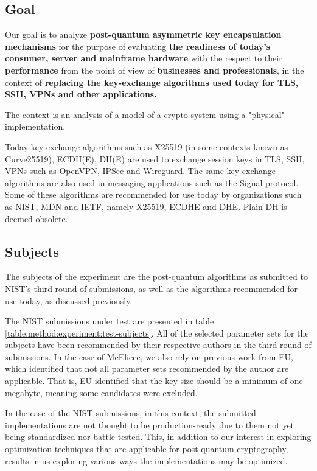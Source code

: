 \subsection{Goal}

Our goal is to analyze \textbf{post-quantum asymmetric key encapsulation mechanisms} for the purpose of evaluating \textbf{the readiness of today's consumer, server and mainframe hardware} with the respect to their \textbf{performance} from the point of view of \textbf{businesses and professionals}, in the context of \textbf{replacing the key-exchange algorithms used today for TLS, SSH, VPNs and other applications.}

The context is an analysis of a model of a crypto system using a "physical" implementation.

Today key exchange algorithms such as X25519 (in some contexts known as Curve25519), ECDH(E), DH(E) are used to exchange session keys in TLS, SSH, VPNs such as OpenVPN, IPSec and Wireguard. The same key exchange algorithms are also used in messaging applications such as the Signal protocol. Some of these algorithms are recommended for use today by organizations such as NIST, MDN and IETF, namely X25519, ECDHE and DHE. Plain DH is deemed obsolete.

\subsection{Subjects}

The subjects of the experiment are the post-quantum algorithms as submitted to NIST's third round of submissions, as well as the algorithms recommended for use today, as discussed previously.

The NIST submissions under test are presented in table \ref{table:method:experiment:test-subjects}. All of the selected parameter sets for the subjects have been recommended by their respective authors in the third round of submissions. In the case of McEliece, we also rely on previous work from EU, which identified that not all parameter sets recommended by the author are applicable. That is, EU identified that the key size should be a minimum of one megabyte, meaning some candidates were excluded.

In the case of the NIST submissions, in this context, the submitted implementations are not thought to be production-ready due to them not yet being standardized nor battle-tested. This, in addition to our interest in exploring optimization techniques that are applicable for post-quantum cryptography, results in us exploring various ways the implementations may be optimized.

